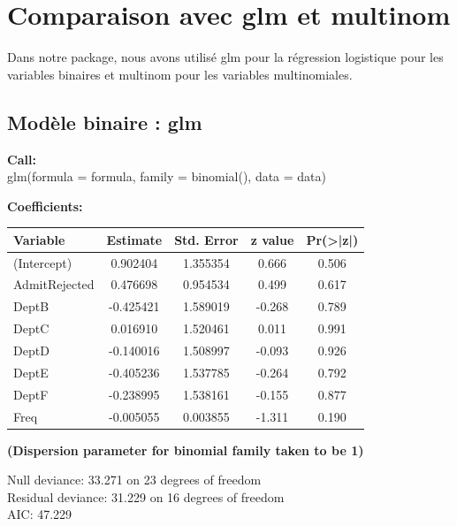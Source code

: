 \documentclass[10pt,french]{report}
\begin{document}
    \section{Comparaison avec glm et multinom}

    Dans notre package, nous avons utilisé glm pour la régression logistique pour les variables binaires et multinom pour les variables multinomiales.

    \subsection{Modèle binaire : glm}

    \begin{flushleft}
    \textbf{Call:} \\
    glm(formula = formula, family = binomial(), data = data)
    \end{flushleft}

    \begin{flushleft}
    \textbf{Coefficients:}
    \end{flushleft}

    \begin{longtable}{lcccc}
    \hline
    \textbf{Variable} & \textbf{Estimate} & \textbf{Std. Error} & \textbf{z value} & \textbf{Pr(>|z|)} \\
    \hline
    \endfirsthead
    \hline
    (Intercept) & 0.902404 & 1.355354 & 0.666 & 0.506 \\
    AdmitRejected & 0.476698 & 0.954534 & 0.499 & 0.617 \\
    DeptB & -0.425421 & 1.589019 & -0.268 & 0.789 \\
    DeptC & 0.016910 & 1.520461 & 0.011 & 0.991 \\
    DeptD & -0.140016 & 1.508997 & -0.093 & 0.926 \\
    DeptE & -0.405236 & 1.537785 & -0.264 & 0.792 \\
    DeptF & -0.238995 & 1.538161 & -0.155 & 0.877 \\
    Freq & -0.005055 & 0.003855 & -1.311 & 0.190 \\
    \hline
    \end{longtable}

    \begin{flushleft}
    \textbf{(Dispersion parameter for binomial family taken to be 1)}
    \end{flushleft}

    \begin{flushleft}
        Null deviance: 33.271 on 23 degrees of freedom \\
    Residual deviance: 31.229 on 16 degrees of freedom \\
    AIC: 47.229
    \end{flushleft}
\end{document}
